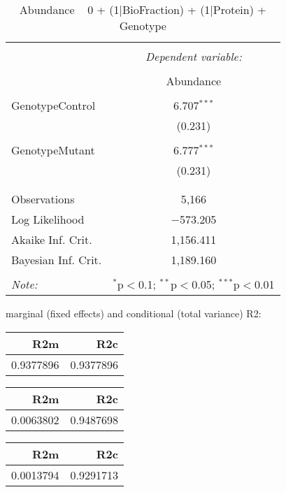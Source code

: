 \documentclass[11pt]{report}
\begin{document}
\begin{table}[!htbp] \centering 
  \caption{Abundance ~ 0 + (1|BioFraction) + (1|Protein) + Genotype} 
  \label{} 
\begin{tabular}{@{\extracolsep{5pt}}lc} 
\\[-1.8ex]\hline 
\hline \\[-1.8ex] 
 & \multicolumn{1}{c}{\textit{Dependent variable:}} \\ 
\cline{2-2} 
\\[-1.8ex] & Abundance \\ 
\hline \\[-1.8ex] 
 GenotypeControl & 6.707$^{***}$ \\ 
  & (0.231) \\ 
  & \\ 
 GenotypeMutant & 6.777$^{***}$ \\ 
  & (0.231) \\ 
  & \\ 
\hline \\[-1.8ex] 
Observations & 5,166 \\ 
Log Likelihood & $-$573.205 \\ 
Akaike Inf. Crit. & 1,156.411 \\ 
Bayesian Inf. Crit. & 1,189.160 \\ 
\hline 
\hline \\[-1.8ex] 
\textit{Note:}  & \multicolumn{1}{r}{$^{*}$p$<$0.1; $^{**}$p$<$0.05; $^{***}$p$<$0.01} \\ 
\end{tabular} 
\end{table} 
marginal (fixed effects) and conditional (total variance) R2:

\begin{tabular}{r|r}
\hline
R2m & R2c\\
\hline
0.9377896 & 0.9377896\\
\hline
\end{tabular}

\begin{tabular}{r|r}
\hline
R2m & R2c\\
\hline
0.0063802 & 0.9487698\\
\hline
\end{tabular}

\begin{tabular}{r|r}
\hline
R2m & R2c\\
\hline
0.0013794 & 0.9291713\\
\hline
\end{tabular}
\end{document}
